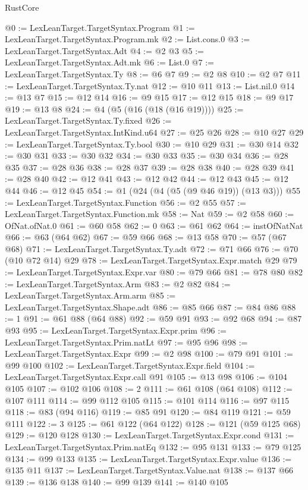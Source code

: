 \begin{lexlean}{RustCore}
\begin{coremodule}
@0 := LexLeanTarget.TargetSyntax.Program
@1 := LexLeanTarget.TargetSyntax.Program.mk
@2 := List.cons.{0}
@3 := LexLeanTarget.TargetSyntax.Adt
@4 := @2 @3
@5 := LexLeanTarget.TargetSyntax.Adt.mk
@6 := List.{0}
@7 := LexLeanTarget.TargetSyntax.Ty
@8 := @6 @7
@9 := @2 @8
@10 := @2 @7
@11 := LexLeanTarget.TargetSyntax.Ty.nat
@12 := @10 @11
@13 := List.nil.{0}
@14 := @13 @7
@15 := @12 @14
@16 := @9 @15
@17 := @12 @15
@18 := @9 @17
@19 := @13 @8
@24 := @4 (@5 (@16 (@18 (@16 @19))))
@25 := LexLeanTarget.TargetSyntax.Ty.fixed
@26 := LexLeanTarget.TargetSyntax.IntKind.u64
@27 := @25 @26
@28 := @10 @27
@29 := LexLeanTarget.TargetSyntax.Ty.bool
@30 := @10 @29
@31 := @30 @14
@32 := @30 @31
@33 := @30 @32
@34 := @30 @33
@35 := @30 @34
@36 := @28 @35
@37 := @28 @36
@38 := @28 @37
@39 := @28 @38
@40 := @28 @39
@41 := @28 @40
@42 := @12 @41
@43 := @12 @42
@44 := @12 @43
@45 := @12 @44
@46 := @12 @45
@54 := @1 (@24 (@4 (@5 (@9 @46 @19)) (@13 @3)))
@55 := LexLeanTarget.TargetSyntax.Function
@56 := @2 @55
@57 := LexLeanTarget.TargetSyntax.Function.mk
@58 := Nat
@59 := @2 @58
@60 := OfNat.ofNat.{0}
@61 := @60 @58
@62 := 0
@63 := @61 @62
@64 := instOfNatNat
@66 := @63 (@64 @62)
@67 := @59 @66
@68 := @13 @58
@70 := @57 (@67 @68)
@71 := LexLeanTarget.TargetSyntax.Ty.adt
@72 := @71 @66
@76 := @70 (@10 @72 @14) @29
@78 := LexLeanTarget.TargetSyntax.Expr.match @29
@79 := LexLeanTarget.TargetSyntax.Expr.var
@80 := @79 @66
@81 := @78 @80
@82 := LexLeanTarget.TargetSyntax.Arm
@83 := @2 @82
@84 := LexLeanTarget.TargetSyntax.Arm.arm
@85 := LexLeanTarget.TargetSyntax.Shape.adt
@86 := @85 @66
@87 := @84 @86
@88 := 1
@91 := @61 @88 (@64 @88)
@92 := @59 @91
@93 := @92 @68
@94 := @87 @93
@95 := LexLeanTarget.TargetSyntax.Expr.prim
@96 := LexLeanTarget.TargetSyntax.Prim.natLt
@97 := @95 @96
@98 := LexLeanTarget.TargetSyntax.Expr
@99 := @2 @98
@100 := @79 @91
@101 := @99 @100
@102 := LexLeanTarget.TargetSyntax.Expr.field
@104 := LexLeanTarget.TargetSyntax.Expr.call @91
@105 := @13 @98
@106 := @104 @105
@107 := @102 @106
@108 := 2
@111 := @61 @108 (@64 @108)
@112 := @107 @111
@114 := @99 @112 @105
@115 := @101 @114
@116 := @97 @115
@118 := @83 (@94 @116)
@119 := @85 @91
@120 := @84 @119
@121 := @59 @111
@122 := 3
@125 := @61 @122 (@64 @122)
@128 := @121 (@59 @125 @68)
@129 := @120 @128
@130 := LexLeanTarget.TargetSyntax.Expr.cond
@131 := LexLeanTarget.TargetSyntax.Prim.natEq
@132 := @95 @131
@133 := @79 @125
@134 := @99 @133
@135 := LexLeanTarget.TargetSyntax.Expr.value
@136 := @135 @11
@137 := LexLeanTarget.TargetSyntax.Value.nat
@138 := @137 @66
@139 := @136 @138
@140 := @99 @139
@141 := @140 @105

\end{coremodule}
\end{lexlean}
